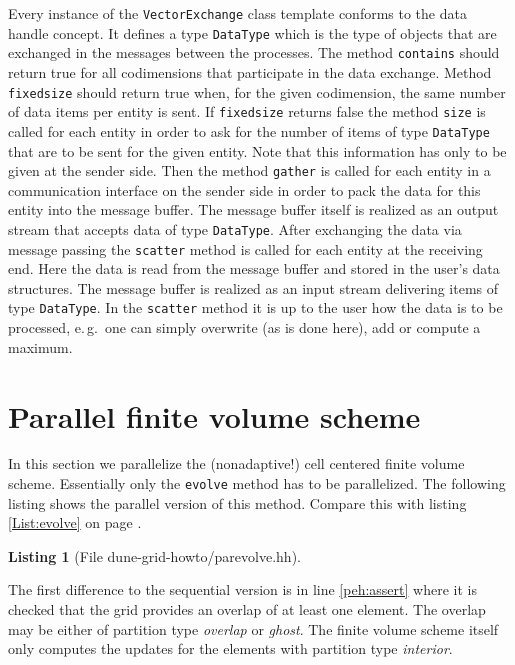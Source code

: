 \documentclass[11pt,a4paper,headinclude,footinclude,DIV16,headings=normal]{scrreprt}
\newtheorem{lst}{Listing}
\begin{document}
Every instance of the \lstinline!VectorExchange! class template
conforms to the data handle concept. It defines a type
\lstinline!DataType! which is the type of objects that are exchanged
in the messages between the processes. The method \lstinline!contains!
should return true for all codimensions that participate in the data
exchange. Method \lstinline!fixedsize! should return true when, for
the given codimension, the same number of data items per entity is
sent. If \lstinline!fixedsize! returns false the method
\lstinline!size! is called for each entity in order to ask
for the number of items of type \lstinline!DataType! that are to be
sent for the given entity. Note that this information has only to be
given at the sender side. Then the method \lstinline!gather! is called
for each entity in a communication interface on the sender side in
order to pack the data for this entity into the message buffer. The
message buffer itself is realized as an output stream that accepts data
of type \lstinline!DataType!. After exchanging the data via message
passing the \lstinline!scatter! method is called for each entity at
the receiving end. Here the data is read from the message buffer and
stored in the user's data structures. The message buffer is realized
as an input stream delivering items of type \lstinline!DataType!. In
the \lstinline!scatter! method it is up to the user how the data is to
be processed, e.\,g.~one can simply overwrite (as is done here), add or
compute a maximum.

\section{Parallel finite volume scheme}

In this section we parallelize the (nonadaptive!) cell centered finite volume
scheme. Essentially only the \lstinline!evolve! method has to be
parallelized. The following listing shows the parallel version of this
method. Compare this with listing \ref{List:evolve} on page \pageref{List:evolve}.

\begin{lst}[File dune-grid-howto/parevolve.hh] \mbox{}
\nopagebreak

\end{lst}

The first difference to the sequential version is in line
\ref{peh:assert} where it is checked that the grid provides an overlap
of at least one element. The overlap may be either of partition type
\textit{overlap} or \textit{ghost}. The finite volume scheme itself
only computes the updates for the elements with partition type
\textit{interior}.
\end{document}
